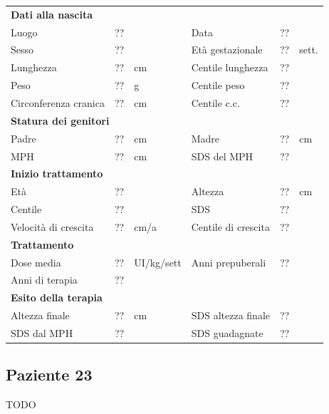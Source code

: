 \begin{table}[!h]
\begin{tabular}{lrllrl}
\toprule
\multicolumn{6}{l}{\textbf{Dati alla nascita}}\\
Luogo 		& \multicolumn{2}{l}{??} 	& Data 					& \multicolumn{2}{l}{??} 	\\
Sesso 		& \multicolumn{2}{l}{??} 	& Età gestazionale 		& ?? 		& sett.\\
Lunghezza 	& ?? 		& cm 				& Centile lunghezza		& ?? 		\\
Peso 		& ?? 		& g					& Centile peso			& ?? 		\\
Circonferenza cranica	& ?? 		& cm 	& Centile c.c.			& ?? \\
\midrule
\multicolumn{6}{l}{\textbf{Statura dei genitori}}\\
Padre 		& ?? & cm 	& Madre 				& ?? & cm \\
MPH 		& ?? & cm 	& SDS del MPH 			& ??\\
\midrule
\multicolumn{6}{l}{\textbf{Inizio trattamento}} \\
Età	& ?? & 		& Altezza 				& ?? & cm  \\
Centile & ?? 	 &		& SDS		& ?? \\
Velocità di crescita & ?? & cm/a	& Centile di crescita & ??\\
\midrule
\multicolumn{6}{l}{\textbf{Trattamento}} \\
Dose media		& ?? & UI/kg/sett & Anni prepuberali & ??\\
Anni di terapia & ??\\
\midrule
\multicolumn{6}{l}{\textbf{Esito della terapia}} \\
Altezza finale			& ?? & cm 	& SDS altezza finale		& ??\\
SDS dal MPH				& ?? &		& SDS guadagnate 			& ??\\
\bottomrule
\end{tabular}
\end{table}
\clearpage


\subsection*{Paziente 23}

TODO

